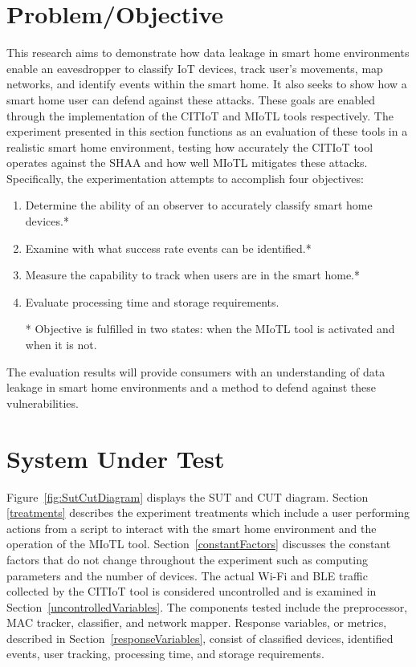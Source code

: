 \documentclass[12pt,letterpaper,oneside]{book}
\begin{document}
		\section{Problem/Objective}
		This research aims to demonstrate how data leakage in smart home environments enable an eavesdropper to classify \ac{IoT} devices, track user's movements, map networks, and identify events within the smart home. It also seeks to show how a smart home user can defend against these attacks. These goals are enabled through the implementation of the \ac{CITIoT} and \ac{MIoTL} tools respectively. The experiment presented in this section functions as an evaluation of these tools in a realistic smart home environment, testing how accurately the \ac{CITIoT} tool operates against the \ac{SHAA} and how well \ac{MIoTL} mitigates these attacks. Specifically, the experimentation attempts to accomplish four objectives:
		\begin{enumerate}
			\item Determine the ability of an observer to accurately classify smart home devices.*
			\item Examine with what success rate events can be identified.*
			\item Measure the capability to track when users are in the smart home.*
			\item Evaluate processing time and storage requirements.
			
			\begin{footnotesize}
			* Objective is fulfilled in two states: when the \ac{MIoTL} tool is activated and when it is not.
			\end{footnotesize}
		\end{enumerate}
		The evaluation results will provide consumers with an understanding of data leakage in smart home environments and a method to defend against these vulnerabilities.
		
		\section{System Under Test}
		Figure~\ref{fig:SutCutDiagram} displays the \ac{SUT} and \ac{CUT} diagram. Section \ref{treatments} describes the experiment treatments which include a user performing actions from a script to interact with the smart home environment and the operation of the \ac{MIoTL} tool. Section~\ref{constantFactors} discusses the constant factors that do not change throughout the experiment such as computing parameters and the number of devices. The actual Wi-Fi and \ac{BLE} traffic collected by the \ac{CITIoT} tool is considered uncontrolled and is examined in Section~\ref{uncontrolledVariables}. The components tested include the preprocessor, \ac{MAC} tracker, classifier, and network mapper. Response variables, or metrics, described in Section~\ref{responseVariables}, consist of classified devices, identified events, user tracking, processing time, and storage requirements.
		
\end{document}
